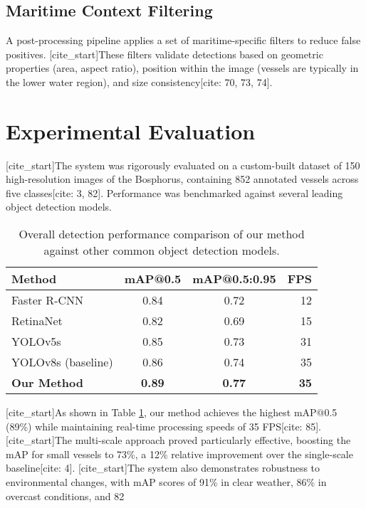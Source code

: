 \documentclass[10pt]{article}
\begin{document}
\subsection{Maritime Context Filtering}
A post-processing pipeline applies a set of maritime-specific filters to reduce false positives. [cite_start]These filters validate detections based on geometric properties (area, aspect ratio), position within the image (vessels are typically in the lower water region), and size consistency[cite: 70, 73, 74].

\section{Experimental Evaluation}
[cite_start]The system was rigorously evaluated on a custom-built dataset of 150 high-resolution images of the Bosphorus, containing 852 annotated vessels across five classes[cite: 3, 82]. Performance was benchmarked against several leading object detection models.

\begin{table}[!ht]
\centering
\caption{Overall detection performance comparison of our method against other common object detection models.}
\label{tab:detection_performance}
  \begin{tabular}{|l|c|c|r|}
  \hline
   \textbf{Method} & \textbf{mAP@0.5} & \textbf{mAP@0.5:0.95} & \textbf{FPS} \\\hline
   Faster R-CNN & 0.84 & 0.72 & 12 \\\hline
   RetinaNet & 0.82 & 0.69 & 15 \\\hline
   YOLOv5s & 0.85 & 0.73 & 31 \\\hline
   YOLOv8s (baseline) & 0.86 & 0.74 & 35 \\\hline
   \textbf{Our Method} & \textbf{0.89} & \textbf{0.77} & \textbf{35} \\\hline
  \end{tabular}
\end{table}

[cite_start]As shown in Table \ref{tab:detection_performance}, our method achieves the highest mAP@0.5 (89\%) while maintaining real-time processing speeds of 35 FPS[cite: 85]. [cite_start]The multi-scale approach proved particularly effective, boosting the mAP for small vessels to 73\%, a 12\% relative improvement over the single-scale baseline[cite: 4]. [cite_start]The system also demonstrates robustness to environmental changes, with mAP scores of 91\% in clear weather, 86\% in overcast conditions, and 82%
\end{document}
